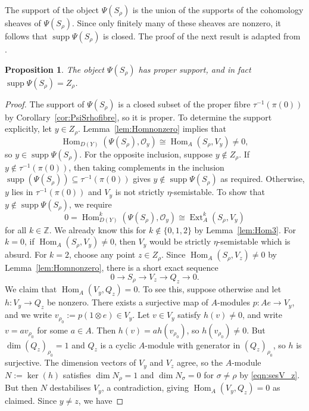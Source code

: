 \documentclass[11pt,reqno]{amsart}
\numberwithin{equation}{section}
\newtheorem{proposition}[theorem]{Proposition}
\theoremstyle{definition}
\newcommand{\ZZ}{\ensuremath{\mathbb{Z}}}
\newcommand{\Ext}{\operatorname{Ext}}
\newcommand{\Hom}{\operatorname{Hom}}
\newcommand{\0}{\operatorname{0}}
\newcommand{\supp}{\operatorname{supp}}
\begin{document}
 The support of the object $\Psi(S_\rho)$ is the union of the supports of the cohomology sheaves of $\Psi(S_\rho)$.  Since only finitely many of these sheaves are nonzero, it follows that $\supp \Psi(S_\rho)$ is closed. The proof of the next result is adapted from \cite[Section~11]{IU16}.
  
 \begin{proposition}
 \label{prop:support}
 The object $\Psi(S_\rho)$ has proper support, and in fact $\supp \Psi(S_\rho) = Z_\rho$.
 \end{proposition}
 \begin{proof}
The support of $\Psi(S_\rho)$ is a closed subset of the proper fibre $\tau^{-1}(\pi(0))$ by Corollary~\ref{cor:PsiSrhofibre}, so it is proper. To determine the support explicitly, 
 let $y\in Z_\rho$. Lemma~\ref{lem:Homnonzero} implies that 
\[
\Hom_{D(Y)}(\Psi(S_\rho),\mathcal{O}_y) \cong \Hom_A(S_\rho,V_y)\neq 0,
\]
 so $y\in \supp \Psi(S_\rho)$. For the opposite inclusion, suppose $y\not\in Z_\rho$. If $y\not\in \tau^{-1}(\pi(0))$, then taking complements in the inclusion $
 \supp(\Psi(S_\rho))\subseteq \tau^{-1}(\pi(0))$ gives $y\not\in  \supp\Psi(S_\rho)$ as required. Otherwise,  $y$ lies in $\tau^{-1}(\pi(0))$ and $V_y$ is not strictly $\eta$-semistable. To show that $y\not \in \supp \Psi(S_\rho)$, we require
 \[
 0=\Hom_{D(Y)}^k(\Psi(S_\rho),\mathcal{O}_y) \cong \Ext^k_A(S_\rho,V_y)
 \] 
 for all $k\in \ZZ$.  We already know this for $k\not\in \{0,1,2\}$ by Lemma~\ref{lem:Hom3}. For $k=0$, if $\Hom_A(S_\rho,V_y)\neq 0$, then $V_y$ would be strictly $\eta$-semistable which is absurd.  For $k=2$, choose any point $z\in Z_\rho$. Since $\Hom_A(S_\rho, V_z)\neq 0$ by Lemma~\ref{lem:Homnonzero}, there is a short exact sequence  
 \begin{equation}
 \label{eqn:sesV_z}
 0\longrightarrow S_\rho
 \longrightarrow V_z\longrightarrow Q_z\longrightarrow 0.
 \end{equation}
 We claim that $\Hom_A(V_y,Q_z) = 0$. To see this, suppose otherwise and let $h\colon V_y\to Q_z$ be nonzero. There exists a surjective map of $A$-modules $p\colon Ae\to V_y$, and we write $v_{\rho_0}:= p(1\otimes e) \in V_y$.  Let $v\in V_y$ satisfy $h(v)\neq 0$, and write $v=av_{\rho_0}$ for some $a\in A$. Then $h(v)= ah(v_{\rho_0})$,  so $h(v_{\rho_0})\neq 0$.  But $ \dim (Q_z)_{\rho_0}=1$ and $Q_z$ is a cyclic $A$-module with generator in $(Q_z)_{\rho_0}$, so $h$ is surjective. The dimension vectors of $V_y$ and $V_z$ agree, so the $A$-module $N:=\ker(h)$ satisfies $\dim N_{\rho} = 1$ and $\dim N_{\sigma} = 0$ for $\sigma\neq \rho$ by \eqref{eqn:sesV_z}. But then $N$ destabilises $V_y$, a contradiction, giving $\Hom_A(V_y,Q_z)=0$ as claimed. Since $y\neq z$, we have 

\end{proof}
\end{document}
